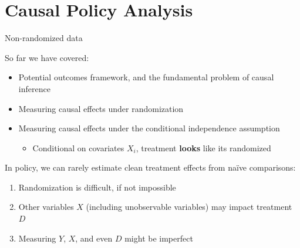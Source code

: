 \section[Policy Analysis]{Causal Policy Analysis}
\miniframesoff
{
\hypersetup{linkcolor=black}
\begin{frame}
    \tableofcontents[currentsection]
\end{frame}
}
\miniframeson

\begin{frame}{Non-randomized data}

So far we have covered:
\begin{itemize}
    \item Potential outcomes framework, and the fundamental problem of causal inference
    \item Measuring causal effects under randomization
    \item Measuring causal effects under the conditional independence assumption
    \begin{itemize}
        \item Conditional on covariates $X_i$, treatment \textbf{looks} like its randomized 
    \end{itemize}
\end{itemize}

\vspace{3ex}
In policy, we can rarely estimate clean treatment effects from na{\"i}ve comparisons:
\begin{enumerate}
    \item Randomization is difficult, if not impossible
    \item Other variables $X$ (including unobservable variables) may impact treatment $D$
    \item Measuring $Y$, $X$, and even $D$ might be imperfect 
\end{enumerate}




\end{frame}

